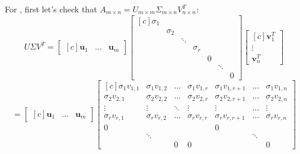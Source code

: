 \documentclass{tufte-handout}
\newcommand*\circled[1]{\tikz[baseline=(char.base)]{
		\node[shape=circle,draw,inner sep=2pt] (char) {#1};}}
\begin{document}
\noindent For \circled{6}, first let's check that $A_{m\times n}=U_{m\times m}\Sigma_{m\times n}V_{n\times n}^T$:
\[
U\Sigma V^T
=
\begin{bmatrix*}[c] \mathbf{u}_{1}&\dots&\mathbf{u}_m \end{bmatrix*}
\begin{bmatrix*}[c]
\sigma_{1}&&&&&&\\
&\sigma_{2}&&&&&\\
&&\ddots&&&&\\
&&&\sigma_{r}&&&\\
&&&&0&&\\
&&&&&\ddots&\\
&&&&&&0
\end{bmatrix*}
\begin{bmatrix*}[c] \mathbf{v}_{1}^T\\ \vdots\\ \mathbf{v}_n^T \end{bmatrix*}
\]
\[
=
\begin{bmatrix*}[c] \mathbf{u}_{1}&\dots&\mathbf{u}_m \end{bmatrix*}
\begin{bmatrix*}[c]
\sigma_{1}v_{1,1}&\sigma_{1}v_{1,2}&\dots&\sigma_{1}v_{1,r}&\sigma_{1}v_{1,r+1}&\dots&\sigma_{1}v_{1,n}\\
\sigma_{2}v_{2,1}&\sigma_{2}v_{2,2}&\dots&\sigma_{2}v_{2,r}&\sigma_{2}v_{2,r+1}&\dots&\sigma_{2}v_{2,n}\\
\vdots&\vdots&\ddots&\vdots&\vdots&\dots&\vdots\\
\sigma_{r}v_{r,1}&\sigma_{r}v_{r,2}&\dots&\sigma_{r}v_{r,r}&\sigma_{r}v_{r,r+1}&\dots&\sigma_{r}v_{r,n}\\
0&&&&0&&\\
&\ddots&&&&\ddots&\\
&&0&0&&&0
\end{bmatrix*}
\]
\end{document}
